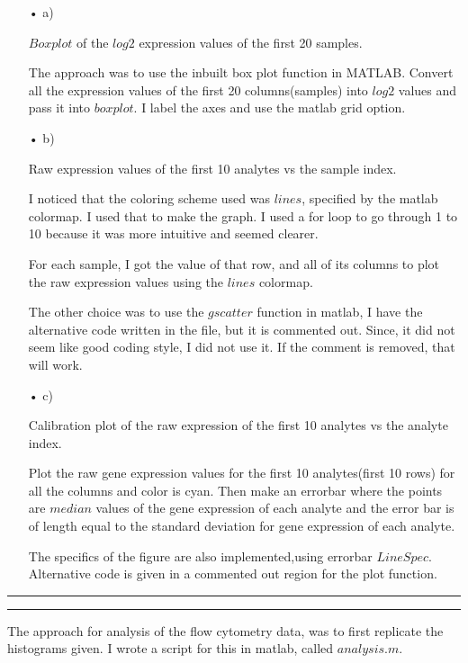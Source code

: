 \documentclass[11pt]{article}
\newcommand{\question}[2] {\vspace{.25in} \hrule\vspace{0.5em}
\noindent{\bf #1: #2} \vspace{0.5em}
\hrule \vspace{.10in}}
\begin{document}
\begin{itemize}

\item[•]a)


$Box plot$ of the $log2$ expression values of the first 20 samples.

The approach was to use the inbuilt box plot function in MATLAB. Convert  all the expression values of the first 20 columns(samples) into $log2$ values and pass it into $boxplot$. I label the axes and use the matlab grid option.

\item[•]b)

Raw expression values of the first 10 analytes vs the sample index.

I noticed that the coloring scheme used was $lines$, specified by the matlab colormap. I used that to make the graph. I used a for loop to go through 1 to 10 because it was more intuitive and seemed clearer. 

For each sample, I got the value of that row, and all of its columns to plot the raw expression values using the $lines$ colormap.

The other choice was to use the $gscatter$ function in matlab, I have the alternative code written in the file, but it is commented out. Since, it did not seem like good coding style, I did not use it. If the comment is removed, that will work.


\item[•]c)

Calibration plot of the raw expression of the first 10 analytes vs the analyte index.

Plot the raw gene expression values for the first 10 analytes(first 10 rows) for all the columns and color is cyan. Then make an errorbar where the points are $median$ values of the gene expression of each analyte and the error bar is of length equal to the standard deviation for gene expression of each analyte.

The specifics of the figure are also implemented,using errorbar $LineSpec$. Alternative code is given in a commented out region for the plot function.


\end{itemize}


\question{2}{Analysis of flow cytometry data}

The approach for analysis of the flow cytometry data, was to first replicate the histograms given. I wrote a script for this in matlab, called $analysis.m$.
\end{document}
